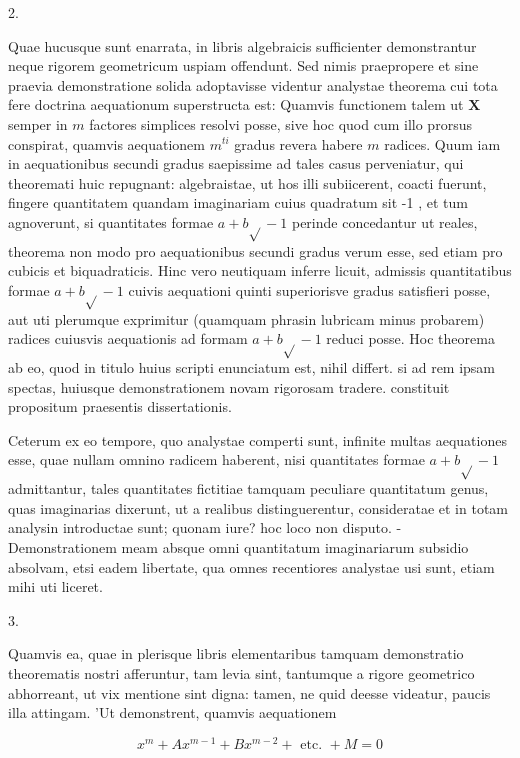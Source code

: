 \documentclass[10pt]{article}
\begin{document}
2.

Quae hucusque sunt enarrata, in libris algebraicis sufficienter demonstrantur neque rigorem geometricum uspiam offendunt. Sed nimis praepropere et sine praevia demonstratione solida adoptavisse videntur analystae theorema cui tota fere doctrina aequationum superstructa est: Quamvis functionem talem ut \(\boldsymbol{X}\) semper in \(m\) factores simplices resolvi posse, sive hoc quod cum illo prorsus conspirat, quamvis aequationem \(m^{t i}\) gradus revera habere \(m\) radices. Quum iam in aequationibus secundi gradus saepissime ad tales casus perveniatur, qui theoremati huic repugnant: algebraistae, ut hos illi subiicerent, coacti fuerunt, fingere quantitatem quandam imaginariam cuius quadratum sit -1 , et tum agnoverunt, si quantitates formae \(a+b \sqrt{ }-1\) perinde concedantur ut reales, theorema non modo pro aequationibus secundi gradus verum esse, sed etiam pro cubicis et biquadraticis. Hinc vero neutiquam inferre licuit, admissis quantitatibus formae \(a+b \sqrt{ }-1\) cuivis aequationi quinti superiorisve gradus satisfieri posse, aut uti plerumque exprimitur (quamquam phrasin lubricam minus probarem) radices cuiusvis aequationis ad formam \(a+b \sqrt{ }-1\) reduci posse. Hoc theorema ab eo, quod in titulo huius scripti enunciatum est, nihil differt. si ad rem ipsam spectas, huiusque demonstrationem novam rigorosam tradere. constituit propositum praesentis dissertationis.

Ceterum ex eo tempore, quo analystae comperti sunt, infinite multas aequationes esse, quae nullam omnino radicem haberent, nisi quantitates formae \(a+b \sqrt{ }-1\) admittantur, tales quantitates fictitiae tamquam peculiare quantitatum genus, quas imaginarias dixerunt, ut a realibus distinguerentur, consideratae et in totam analysin introductae sunt; quonam iure? hoc loco non disputo. - Demonstrationem meam absque omni quantitatum imaginariarum subsidio absolvam, etsi eadem libertate, qua omnes recentiores analystae usi sunt, etiam mihi uti liceret.

3.

Quamvis ea, quae in plerisque libris elementaribus tamquam demonstratio theorematis nostri afferuntur, tam levia sint, tantumque a rigore geometrico abhorreant, ut vix mentione sint digna: tamen, ne quid deesse videatur, paucis illa attingam. 'Ut demonstrent, quamvis aequationem

\[
x^{m}+A x^{m-1}+B x^{m-2}+\text { etc. }+M=0
\]
\end{document}
